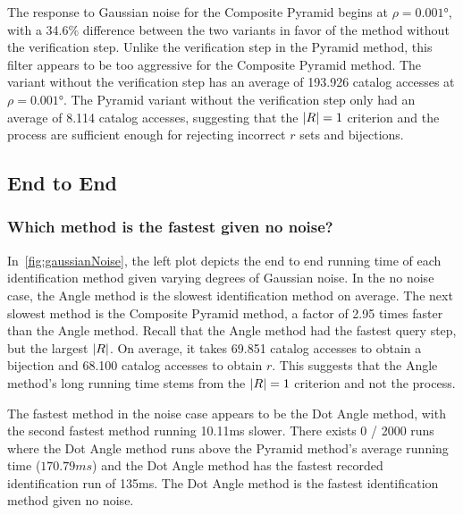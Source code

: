 The response to Gaussian noise for the Composite Pyramid begins at $\rho=\ang{0.001}$, with a 34.6\% difference
between the two variants in favor of the method without the verification step.
Unlike the verification step in the Pyramid method, this filter appears to be too aggressive for the Composite Pyramid
method.
The variant without the verification step has an average of 193.926 catalog accesses at $\rho=\ang{0.001}$.
The Pyramid variant without the verification step only had an average of 8.114 catalog accesses, suggesting that the
$\left| R \right| = 1$ criterion and the  process are sufficient enough for rejecting incorrect $r$ sets and
bijections.

\subsection{End to End}\label{subsec:endToEndEvaluation}
\subsubsection{Which method is the fastest given no noise?}
In~\autoref{fig:gaussianNoise}, the left plot depicts the end to end running time of each identification method given
varying degrees of Gaussian noise.
In the no noise case, the Angle method is the slowest identification method on average.
The next slowest method is the Composite Pyramid method, a factor of 2.95 times faster than the Angle method.
Recall that the Angle method had the fastest query step, but the largest $\left| R \right|$.
On average, it takes 69.851 catalog accesses to obtain a bijection and 68.100 catalog accesses to obtain $r$.
This suggests that the Angle method's long running time stems from the $\left| R \right| = 1$ criterion and not the 
process.

The fastest method in the noise case appears to be the Dot Angle method, with the second fastest method running
10.11\si{ms} slower.
There exists 0 / 2000 runs where the Dot Angle method runs above the Pyramid method's average running time
($170.79\si{ms}$) and the Dot Angle method has the fastest recorded identification run of 135ms.
The Dot Angle method is the fastest identification method given no noise.

